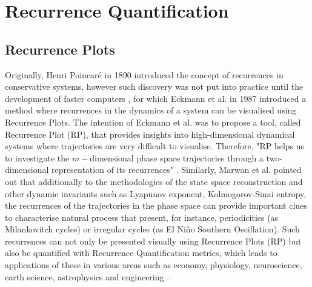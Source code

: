 \documentclass[fleqn,10pt]{wlscirep}
\begin{document}
\section*{Recurrence Quantification}\label{sec:recurrence-quantification}
\subsection*{Recurrence Plots}
Originally, Henri Poincar\'e in 1890 introduced the concept of recurrences 
in conservative systems, however such discovery was not put into practice 
until the development of faster computers \cite{marwan2007},
for which Eckmann et al. \cite{eckmann1987} in 1987 introduced a method
where recurrences in the dynamics of a system can be visualised using 
Recurrence Plots. The intention of Eckmann et al. \cite{eckmann1987} was to 
propose a tool, called Recurrence Plot (RP), that provides insights into 
high-dimensional dynamical systems where trajectories are very difficult to 
visualise. Therefore, "RP helps us to investigate the 
$m-$dimensional phase space trajectories through a two-dimensional 
representation of its recurrences" \cite{marwan2015}.
Similarly, Marwan et al. \cite{marwan2015} pointed out that additionally 
to the methodologies of the state space reconstruction and other dynamic 
invariants such as Lyapunov exponent, Kolmogorov-Sinai entropy, 
the recurrences of the trajectories in the phase space can provide 
important clues to characterise natural process that present, for
instance, periodicities (as Milankovitch cycles) or irregular cycles 
(as El Ni\~no Southern Oscillation). 
Such recurrences can not only be presented visually using Recurrence Plots (RP) 
but also be quantified with Recurrence Quantification metrics, which leads 
to applications of these in various areas such as economy, physiology, 
neuroscience, earth science, astrophysics and engineering \cite{marwan2007}.
\end{document}
